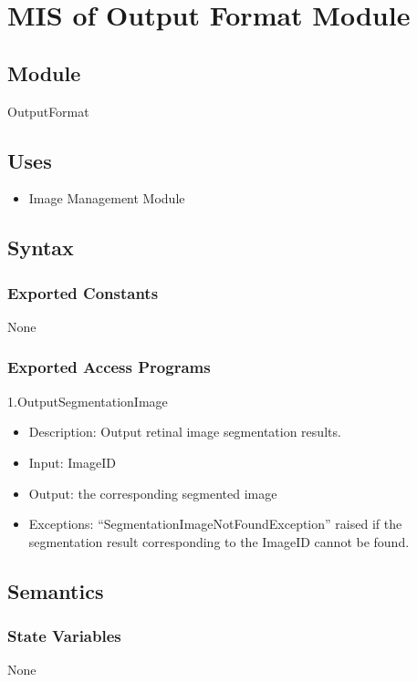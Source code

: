\documentclass[12pt, titlepage]{article}
\begin{document}
\newpage
\section{MIS of Output Format Module} \label{m5}

\subsection{Module}
OutputFormat

\subsection{Uses}
\begin{itemize}
    \item Image Management Module

\end{itemize}

\subsection{Syntax}

\subsubsection{Exported Constants}
None 
\subsubsection{Exported Access Programs}
1.OutputSegmentationImage
\begin{itemize}
    \item Description: Output retinal image segmentation results.
    \item Input: ImageID
    \item Output: the corresponding segmented image
    \item Exceptions: “SegmentationImageNotFoundException” raised if the segmentation result corresponding to the ImageID cannot be found.
\end{itemize}

\subsection{Semantics}

\subsubsection{State Variables}
None
\end{document}
